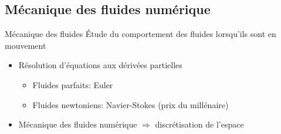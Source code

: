 \documentclass{beamer}
\begin{document}
\subsection{Mécanique des fluides numérique}
\begin{frame}
  \begin{block}{Mécanique des fluides}
    Étude du comportement des fluides lorsqu'ils sont en mouvement
  \end{block}
  
  \begin{itemize}
  \item Résolution d'équations aux dérivées partielles
    \begin{itemize}
    \item Fluides parfaits: Euler
    \item Fluides newtoniens: Navier-Stokes (prix du millénaire)
    \end{itemize}
  \item Mécanique des fluides numérique $\Rightarrow$ discrétisation de l'espace
  \end{itemize}


\end{frame}
\end{document}
